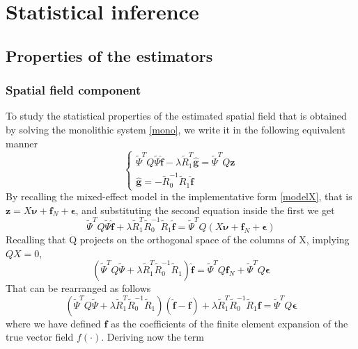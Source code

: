\chapter{Statistical inference}
\section{Properties of the estimators}
\subsection{Spatial field component}
\nocite{*}
To study the statistical properties of the estimated spatial field that is obtained by solving the monolithic system \ref{mono}, we write it in the following equivalent manner
\begin{equation}
	\begin{cases}
		\tilde{\Psi}^TQ\tilde{\Psi} \hat{\bm{f}} -\lambda \tilde{R}_1^T \hat{\bm{g}} = \tilde{\Psi}^T Q\mathbf{z} \\
		\hat{\bm{g}} = - \tilde{R}_0^{-1} \tilde{R}_1 \hat{\bm{f}}
	\end{cases}
\end{equation}
By recalling the mixed-effect model in the implementative form
\ref{modelX}, that is $\bm{z} = X \bm{\nu} + \bm{f}_N + \bm{\epsilon}$, and
substituting the second equation inside the first we get
\begin{equation}
	\tilde{\Psi}^TQ\tilde{\Psi} \hat{\bm{f}} +\lambda \tilde{R}_1^T \tilde{R}_0^{-1} \tilde{R}_1 \hat{\bm{f}} = \tilde{\Psi}^T Q \left( X \bm{\nu} + \bm{f}_N + \bm{\epsilon} \right)
\end{equation}
Recalling that Q projects on the orthogonal space of the columns of
X, implying $Q X = 0$,
\begin{equation}
	\left(\tilde{\Psi}^TQ\tilde{\Psi} +\lambda \tilde{R}_1^T \tilde{R}_0^{-1} \tilde{R}_1 \right) \hat{\bm{f}} = \tilde{\Psi}^T Q \bm{f}_N + \tilde{\Psi}^T Q \bm{\epsilon}
\end{equation}
That can be rearranged as follows
\begin{equation}
	\left(\tilde{\Psi}^TQ\tilde{\Psi} +\lambda \tilde{R}_1^T \tilde{R}_0^{-1} \tilde{R}_1 \right)
	\left(\hat{\bm{f}} - \bm{f}\right)
	+ \lambda \tilde{R}_1^T \tilde{R}_0^{-1} \tilde{R}_1 \bm{f} = \tilde{\Psi}^T Q \bm{\epsilon}
\end{equation}
where we have defined $\bm{f}$ as the coefficients of the finite
element expansion of the true vector field $f(\cdot)$. Deriving now the term
